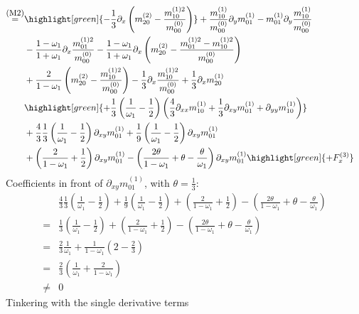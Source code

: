 \documentclass{article}
\begin{document}
\begin{align*}
{  }
  \\ \overset{\text{\small(M2)}}{=} &
  \highlight[green]{
  - \frac{1}{3} \partial_x \left(m_{20}^{(2)} - \frac{m_{10}^{(1)2}}{m_{00}^{(0)}}\right)
  }
  + \frac{m_{10}^{(1)}}{m_{00}^{(0)}} \partial_y m_{01}^{(1)}
  - m_{01}^{(1)} \partial_y \frac{m_{10}^{(1)}}{m_{00}^{(0)}}
  \\&
  - \frac{1 - \omega_1}{1 + \omega_1} \partial_x \frac{m_{01}^{(1)2}}{m_{00}^{(0)}}
  - \frac{1 - \omega_1}{1 + \omega_1} \partial_x \left(m_{20}^{(2)} - \frac{m_{01}^{(1)2} - m_{10}^{(1)2}}{m_{00}^{(0)}}\right)
  \\&
  + \frac{2}{1-\omega_1} \left(m_{20}^{(2)} - \frac{m_{10}^{(1)2}}{m_{00}^{(0)}}\right)
  - \frac{1}{3} \partial_x \frac{m_{10}^{(1)2}}{m_{00}^{(0)}}
  + \frac{1}{3} \partial_x m_{20}^{(1)}
  \\&
  \highlight[green]{
  + \frac{1}{3}\left(\frac{1}{\omega_1}-\frac{1}{2}\right) \left(\frac{4}{3}\partial_{xx} m_{10}^{(1)} + \frac{1}{3} \partial_{xy}m_{01}^{(1)} + \partial_{yy}m_{10}^{(1)}\right)
  }
  \\&
  + \frac{4}{3}\frac{1}{3}\left(\frac{1}{\omega_1}-\frac{1}{2}\right) \partial_{xy}m_{01}^{(1)}
  + \frac{1}{9}\left(\frac{1}{\omega_1}-\frac{1}{2}\right) \partial_{xy}m_{01}^{(1)}
  \\&
  + \left(\frac{2}{1-\omega_1} + \frac{1}{2}\right) \partial_{xy}m_{01}^{(1)}
  - \left(\frac{2\theta}{1-\omega_1} +\theta- \frac{\theta}{\omega_1}\right) \partial_{xy}m_{01}^{(1)}
  \highlight[green]{
  + F_x^{(3)}
  }
\end{align*}
Coefficients in front of $\partial_{xy}m_{01}^{(1)}$, with $\theta=\frac{1}{3}$:
\begin{align*}
  & \frac{4}{3}\frac{1}{3}\left(\frac{1}{\omega_1}-\frac{1}{2}\right)
  + \frac{1}{9}\left(\frac{1}{\omega_1}-\frac{1}{2}\right)
  + \left(\frac{2}{1-\omega_1} + \frac{1}{2}\right)
  - \left(\frac{2\theta}{1-\omega_1} +\theta- \frac{\theta}{\omega_1}\right)
  \\=&
  \frac{1}{3}\left(\frac{1}{\omega_1}-\frac{1}{2}\right)
  + \left(\frac{2}{1-\omega_1} + \frac{1}{2}\right)
  - \left(\frac{2\theta}{1-\omega_1} +\theta- \frac{\theta}{\omega_1}\right)
  \\=&
  \frac{2}{3}\frac{1}{\omega_1}
  + \frac{1}{1-\omega_1} \left( 2 - \frac{2}{3}\right)
  \\=&
  \frac{2}{3}\left(\frac{1}{\omega_1} + \frac{2}{1-\omega_1} \right)
  \\\neq&0
\end{align*}
Tinkering with the single derivative terms
\end{document}
